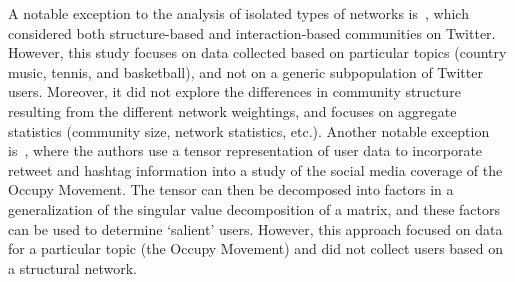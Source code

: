 A notable exception to the analysis of isolated types of networks is~\cite{lim2012tweets}, which considered both structure-based and interaction-based communities on Twitter. However, this study focuses on data collected based on particular topics (country music, tennis, and basketball), and not on a generic subpopulation of Twitter users. Moreover, it did not explore the differences in community structure resulting from the different network weightings, and focuses on aggregate statistics (community size, network statistics, etc.). Another notable exception is~\cite{kao2013talison}, where the authors use a tensor representation of user data to incorporate retweet and hashtag information into a study of the social media coverage of the Occupy Movement. The tensor can then be decomposed into factors in a generalization of the singular value decomposition of a matrix, and these factors can be used to determine `salient' users. However, this approach focused on data for a particular topic (the Occupy Movement) and did not collect users based on a structural network.